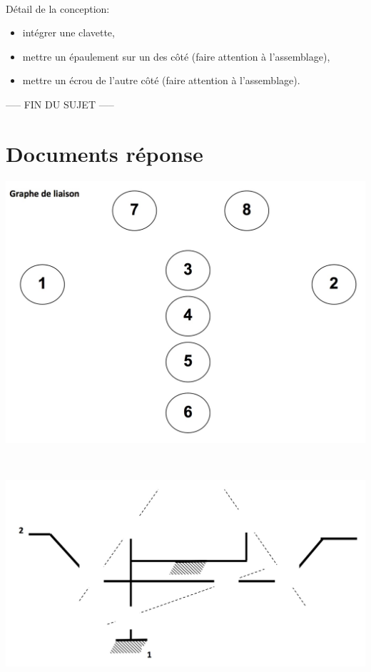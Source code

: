 
~\

Détail de la conception:
\begin{itemize}
 \item intégrer une clavette,
 \item mettre un épaulement sur un des côté (faire attention à l'assemblage),
 \item mettre un écrou de l'autre côté (faire attention à l'assemblage).
\end{itemize}

\begin{center}
----- FIN DU SUJET -----
\end{center}

\cleardoublepage

\pagestyle{documentreponse}

\section{Documents réponse}



\vspace{-3cm}

\begin{center}
\includegraphics[width=0.6\linewidth]{img/Q1}
\end{center}

~\

\vspace{10cm}


\begin{center}
\includegraphics[width=0.6\linewidth]{img/Q2}
\end{center}


